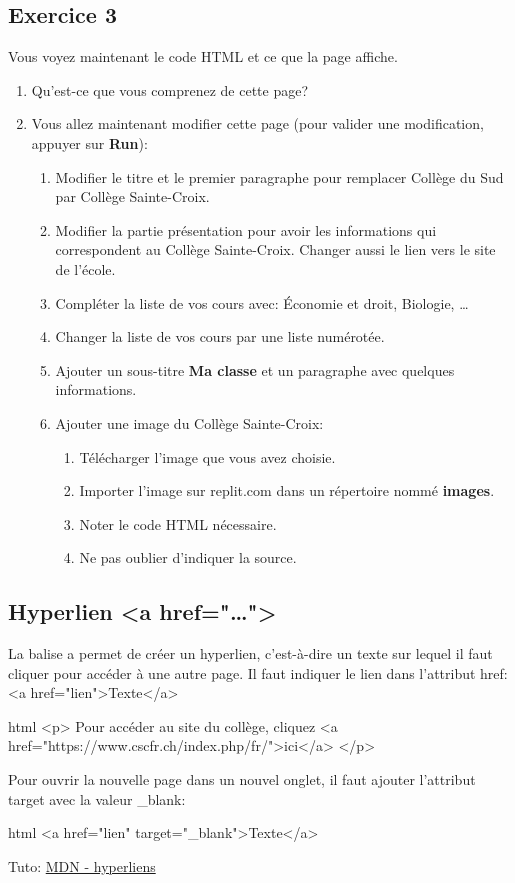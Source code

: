 \documentclass[a4paper,11pt]{article}
\begin{document}
\subsection{Exercice 3}
Vous voyez maintenant le code HTML et ce que la page affiche.
\begin{enumerate}[label=\arabic*)]
\item Qu'est-ce que vous comprenez de cette page?
\item Vous allez maintenant modifier cette page (pour valider une modification, appuyer sur \textbf{Run}):
\begin{enumerate}
  \item Modifier le titre et le premier paragraphe pour remplacer Collège du Sud par Collège Sainte-Croix.
  \item Modifier la partie présentation pour avoir les informations qui correspondent au Collège Sainte-Croix. Changer aussi le lien vers le site de l'école.
  \item Compléter la liste de vos cours avec: Économie et droit, Biologie, \dots
  \item Changer la liste de vos cours par une liste numérotée.
  \item Ajouter un sous-titre \textbf{Ma classe} et un paragraphe avec quelques informations.
  \item Ajouter une image du Collège Sainte-Croix:
\begin{enumerate}[label=\roman*.]
    \item Télécharger l'image que vous avez choisie.
    \item Importer l'image sur replit.com dans un répertoire nommé \textbf{images}.
    \item Noter le code HTML nécessaire.
  \item Ne pas oublier d'indiquer la source.
\end{enumerate}
\end{enumerate}
\end{enumerate}

\subsection{Hyperlien <a href="\dots">}
La balise a permet de créer un  hyperlien, c'est-à-dire un texte sur lequel il faut cliquer pour accéder à une autre page. Il faut indiquer le lien dans l'attribut href:
<a href="lien">Texte</a>
\begin{code}{html}
<p>
  Pour accéder au site du collège,
  cliquez <a href="https://www.cscfr.ch/index.php/fr/">ici</a>
</p>
\end{code}
Pour ouvrir la nouvelle page dans un nouvel onglet, il faut ajouter l'attribut target avec la valeur \_blank:
\begin{code}{html}
<a href="lien" target="_blank">Texte</a>
\end{code}
Tuto: \href{https://developer.mozilla.org/fr/docs/Web/HTML/Element/a}{MDN - hyperliens}
\end{document}
